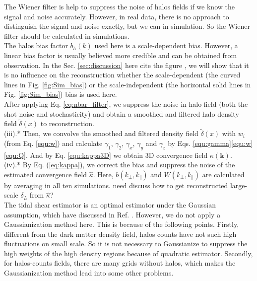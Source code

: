 The Wiener filter is help to suppress the noise of halos fields if we know
the signal and noise accurately. However, in real data, there is no 
approach to distinguish the signal and noise exactly, 
but we can in simulation. 
So the Wiener filter should be calculated in simulations.\\
The halos bias factor $b_h(k)$ used here is a scale-dependent bias.
However, a linear bias factor is usually believed more credible and can
be obtained from observation. In the Sec. \ref{sec:discussion}
{\color{red} here cite the figure}
, we will show that it is no influence on the reconstruction whether 
the scale-dependent (the curved lines in Fig. \ref{fig:Sim_bias}) or 
the scale-independent (the horizontal solid lines in Fig. \ref{fig:Sim_bias}) 
bias is used here.
\\
 After applying Eq. \eqref{eq:nbar_filter}, we
 suppress the noise in halo field (both the shot noise and stochasticity)
and obtain a smoothed and filtered halo density field $\tilde{\delta}(x)$
 to reconstruction.
\\
(iii).{\color{red}*}
 Then, we convolve the smoothed and filtered density field 
$\tilde{\delta}(x)$ with $w_i$ (from Eq. \ref{equ:w})
 and calculate $\gamma_1$, $\gamma_2$, $\gamma_x$,
$\gamma_y$ and $\gamma_z$ by 
Eqs. \eqref{equ:gamma}\eqref{equ:w}\eqref{equ:Q}. And by
Eq. \eqref{equ:kappa3D} we obtain 3D convergence field 
$\kappa(\bm{k})$.\\
(iv).{\color{red}*}
 By Eq. (\ref{eq:kappa}), we correct the bias and suppress the noise
of the estimated convergence field $\hat{\kappa}$. Here,
 $b(k_{\perp},k_{\parallel})$ and $W(k_{\perp},k_{\parallel})$ 
 are calculated by averaging in all ten simulations.
 {\color{blue} need discuss how to get reconstructed large-scale $\delta_{L}$
 from $\hat{\kappa}$?}\\
 
 The tidal shear estimator is an optimal estimator  under the Gaussian
  assumption, which have discussed in  Ref. \citep{2016PhRvD..93j3504Z}.
 However, we do not apply a Gaussianization method here. This is because of 
 the following points.
 Firstly, different from the dark matter density field, halos counts have 
 not such high fluctuations on small scale. So it is not necessary to
 Gaussianize to suppress the high weights of the high density regions 
 because of quadratic estimator. Secondly, for halos-counts fields, there are
 many grids without halos, which makes the Gaussianization method 
 lead into some other problems.  
 \\
